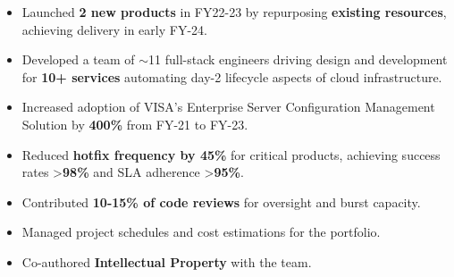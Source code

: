 \begin{itemize}
    \item Launched \textbf{2 new products} in FY22-23 by repurposing \textbf{existing resources}, achieving delivery in early FY-24.
    \item Developed a team of \(\sim\)11 full-stack engineers driving design and development for \textbf{10+ services} automating day-2 lifecycle aspects of cloud infrastructure.
    \item Increased adoption of VISA's Enterprise Server Configuration Management Solution by \textbf{400\%} from FY-21 to FY-23.
    \item Reduced \textbf{hotfix frequency by 45\%} for critical products, achieving success rates >\textbf{98\%} and SLA adherence >\textbf{95\%}.
    \item Contributed \textbf{10-15\% of code reviews} for oversight and burst capacity.
    \item Managed project schedules and cost estimations for the portfolio.
    \item Co-authored \textbf{Intellectual Property} with the team.
  \end{itemize}